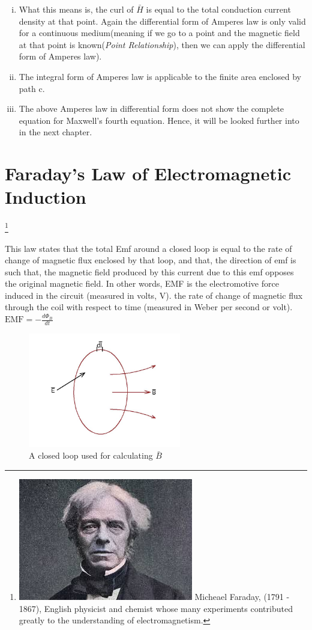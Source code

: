\begin{enumerate}[(i)]
	\item What this means is, the curl of $\bar{H}$ is equal to the total conduction current density at that point. Again the differential form of Amperes law is only valid for a continuous medium(meaning if we go to a point and the magnetic field at that point is known(\emph{Point Relationship}), then we can apply the differential form of Amperes law).
	\item The integral form of Amperes law is applicable to the finite area enclosed by path c.
	\item The above Amperes law in differential form does not show the complete equation for Maxwell's fourth equation. Hence, it will be looked further into in the next chapter.
\end{enumerate}

\section{Faraday's Law of Electromagnetic Induction} 
\footnote{
\includegraphics[scale=0.2]{graphics/faraday} 
Micheael Faraday, (1791 - 1867), English physicist and chemist whose many experiments contributed greatly to the understanding of electromagnetism.
}

This law states that the total Emf around a closed loop is equal to the rate of change of magnetic flux enclosed by that loop, and that, the direction of emf is such that, the magnetic field produced by this current due to this emf opposes the original magnetic field.
In other words, EMF is the electromotive force induced in the circuit (measured in volts, V). the rate of change of magnetic flux through the coil with respect to time (measured in Weber per second or volt).
$\text{EMF} = -\frac{d\Phi_B}{dt}
$\begin{figure}[h]
	\centering
	\includegraphics[height=5cm]{graphics/k}
	\caption{A closed loop used for calculating $\bar{B}$}
	\label{fig:k}
\end{figure}

